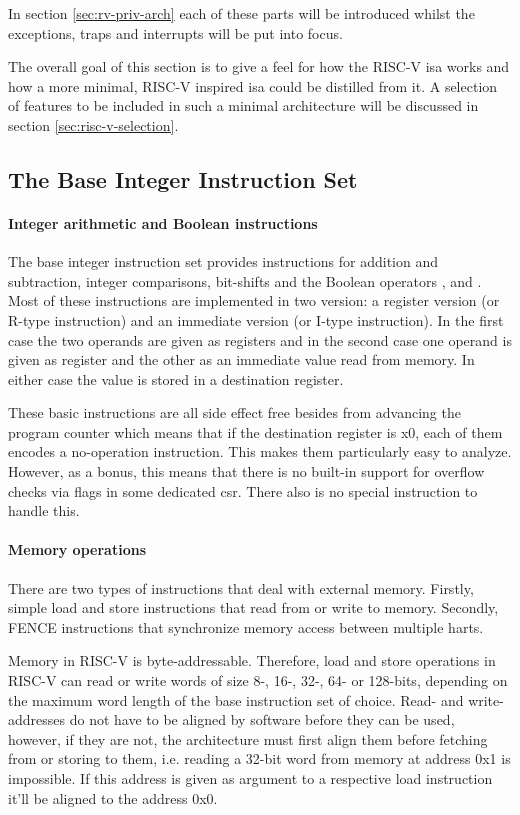 In section \ref{sec:rv-priv-arch} each of these parts will be introduced whilst the exceptions, traps and interrupts will be put into focus.

The overall goal of this section is to give a feel for how the RISC-V \gls{isa} works and how a more minimal, RISC-V inspired \gls{isa} could be distilled from it.
A selection of features to be included in such a minimal architecture will be discussed in section \ref{sec:risc-v-selection}.

\subsection{The Base Integer Instruction Set}
\label{sec:rv-base-int-isa}

\paragraph{Integer arithmetic and Boolean instructions}
The base integer instruction set provides instructions for addition and subtraction, integer comparisons, bit-shifts and the Boolean operators ,  and .
Most of these instructions are implemented in two version: a register version (or R-type instruction) and an immediate version (or I-type instruction).
In the first case the two operands are given as registers and in the second case one operand is given as register and the other as an immediate value read from memory.
In either case the value is stored in a destination register.

These basic instructions are all side effect free besides from advancing the program counter which means that if the destination register is x0, each of them encodes a no-operation instruction.
This makes them particularly easy to analyze.
However, as a bonus, this means that there is no built-in support for overflow checks via flags in some dedicated \gls{csr}.
There also is no special instruction to handle this.

\paragraph{Memory operations}
There are two types of instructions that deal with external memory.
Firstly, simple load and store instructions that read from or write to memory.
Secondly, FENCE instructions that synchronize memory access between multiple \glspl{hart}.

Memory in RISC-V is byte-addressable.
Therefore, load and store operations in RISC-V can read or write words of size 8-, 16-, 32-, 64- or 128-bits, depending on the maximum word length of the base instruction set of choice.
Read- and write-addresses do not have to be aligned by software before they can be used, however, if they are not, the architecture must first align them before fetching from or storing to them, i.e. reading a 32-bit word from memory at address 0x1 is impossible.
If this address is given as argument to a respective load instruction it'll be aligned to the address 0x0.

